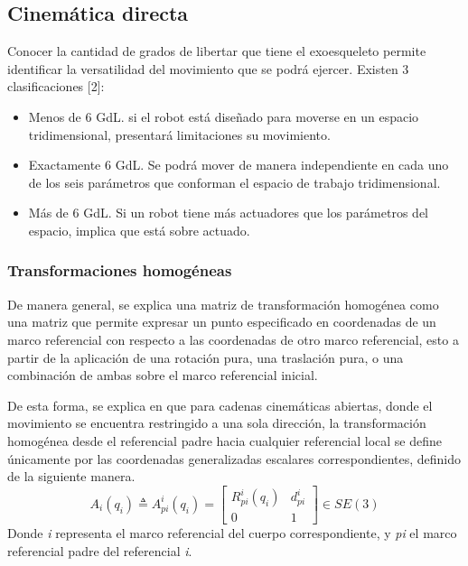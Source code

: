 \subsection{Cinemática directa}
    \noindent Conocer la cantidad de grados de libertar que tiene el exoesqueleto permite identificar 
    la versatilidad del movimiento que se podrá ejercer. Existen 3 clasificaciones [2]:

    \begin{itemize}
        \item Menos de 6 GdL.  si el robot está diseñado para moverse en un espacio tridimensional, presentará  limitaciones su movimiento. 
        \item Exactamente 6 GdL. Se podrá mover de manera independiente en cada uno de los seis parámetros que conforman el espacio de trabajo tridimensional.
        \item Más de 6 GdL. Si un robot tiene más actuadores que los parámetros del espacio, implica que está sobre actuado.
    \end{itemize}

    \subsubsection{Transformaciones homogéneas}
        \noindent De manera general, se explica una matriz de transformación homogénea como una
        matriz que permite expresar un punto especificado en coordenadas de
        un marco referencial con respecto a las coordenadas de otro marco 
        referencial, esto a partir de la aplicación de una rotación pura, 
        una traslación pura, o una combinación de ambas sobre el marco referencial
        inicial.

        De esta forma, se explica en \cite{3DMotion} que para cadenas cinemáticas abiertas, 
        donde el movimiento se encuentra restringido a una sola dirección, la 
        transformación homogénea desde el referencial padre hacia cualquier referencial 
        local se define únicamente por las coordenadas generalizadas escalares 
        correspondientes, definido de la siguiente manera.
        \begin{equation*} 
            A_i(q_i) \triangleq A^i_{pi}(q_i) =
            \begin{bmatrix}
                R^i_{pi}(q_i) & d^i_{pi}\\
                0 & 1
            \end{bmatrix}
            \in SE(3)
        \end{equation*}
        Donde \emph{i} representa el marco referencial del cuerpo
        correspondiente, y \emph{pi} el marco referencial padre del 
        referencial \emph{i}.

